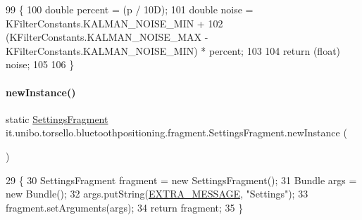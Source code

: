 \begin{DoxyCode}
99                                                    \{
100         \textcolor{keywordtype}{double} percent = (p / 10D);
101         \textcolor{keywordtype}{double} noise = KFilterConstants.KALMAN\_NOISE\_MIN +
102                 (KFilterConstants.KALMAN\_NOISE\_MAX - KFilterConstants.KALMAN\_NOISE\_MIN) * percent;
103 
104         \textcolor{keywordflow}{return} (\textcolor{keywordtype}{float}) noise;
105 
106     \}
\end{DoxyCode}
\hypertarget{classit_1_1unibo_1_1torsello_1_1bluetoothpositioning_1_1fragment_1_1SettingsFragment_a4eb69c78cde2ba119eb62453688280f5_a4eb69c78cde2ba119eb62453688280f5}{}\label{classit_1_1unibo_1_1torsello_1_1bluetoothpositioning_1_1fragment_1_1SettingsFragment_a4eb69c78cde2ba119eb62453688280f5_a4eb69c78cde2ba119eb62453688280f5} 
\paragraph{\texorpdfstring{new\+Instance()}{newInstance()}}
{\footnotesize\ttfamily static \hyperlink{classit_1_1unibo_1_1torsello_1_1bluetoothpositioning_1_1fragment_1_1SettingsFragment}{Settings\+Fragment} it.\+unibo.\+torsello.\+bluetoothpositioning.\+fragment.\+Settings\+Fragment.\+new\+Instance (\begin{DoxyParamCaption}{ }\end{DoxyParamCaption})\hspace{0.3cm}{\ttfamily [static]}}


\begin{DoxyCode}
29                                                  \{
30         SettingsFragment fragment = \textcolor{keyword}{new} SettingsFragment();
31         Bundle args = \textcolor{keyword}{new} Bundle();
32         args.putString(\hyperlink{classit_1_1unibo_1_1torsello_1_1bluetoothpositioning_1_1fragment_1_1SettingsFragment_a3f3c627008cd1e176afc52642c73fd93_a3f3c627008cd1e176afc52642c73fd93}{EXTRA\_MESSAGE}, \textcolor{stringliteral}{"Settings"});
33         fragment.setArguments(args);
34         \textcolor{keywordflow}{return} fragment;
35     \}
\end{DoxyCode}
\hypertarget{classit_1_1unibo_1_1torsello_1_1bluetoothpositioning_1_1fragment_1_1SettingsFragment_a7de90efb25e655078f5f8984f7c6d628_a7de90efb25e655078f5f8984f7c6d628}{}\label{classit_1_1unibo_1_1torsello_1_1bluetoothpositioning_1_1fragment_1_1SettingsFragment_a7de90efb25e655078f5f8984f7c6d628_a7de90efb25e655078f5f8984f7c6d628} 
